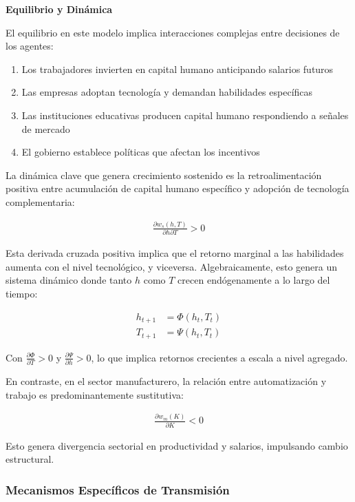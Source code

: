 \documentclass{article}
\theoremstyle{remark}
\theoremstyle{definition}
\begin{document}
\begin{tcolorbox}
\textbf{Equilibrio y Dinámica}

El equilibrio en este modelo implica interacciones complejas entre decisiones de los agentes:

\begin{enumerate}
\item Los trabajadores invierten en capital humano anticipando salarios futuros
\item Las empresas adoptan tecnología y demandan habilidades específicas
\item Las instituciones educativas producen capital humano respondiendo a señales de mercado
\item El gobierno establece políticas que afectan los incentivos
\end{enumerate}

La dinámica clave que genera crecimiento sostenido es la retroalimentación positiva entre acumulación de capital humano específico y adopción de tecnología complementaria:

\begin{align}
\frac{\partial w_s(h,T)}{\partial h \partial T} > 0
\end{align}

Esta derivada cruzada positiva implica que el retorno marginal a las habilidades aumenta con el nivel tecnológico, y viceversa. Algebraicamente, esto genera un sistema dinámico donde tanto $h$ como $T$ crecen endógenamente a lo largo del tiempo:

\begin{align}
h_{t+1} &= \Phi(h_t, T_t)\\
T_{t+1} &= \Psi(h_t, T_t)
\end{align}

Con $\frac{\partial \Phi}{\partial T} > 0$ y $\frac{\partial \Psi}{\partial h} > 0$, lo que implica retornos crecientes a escala a nivel agregado.

En contraste, en el sector manufacturero, la relación entre automatización y trabajo es predominantemente sustitutiva:

\begin{align}
\frac{\partial w_m(K)}{\partial K} < 0
\end{align}

Esto genera divergencia sectorial en productividad y salarios, impulsando cambio estructural.

\subsubsection*{Mecanismos Específicos de Transmisión}


\end{tcolorbox}
\end{document}
